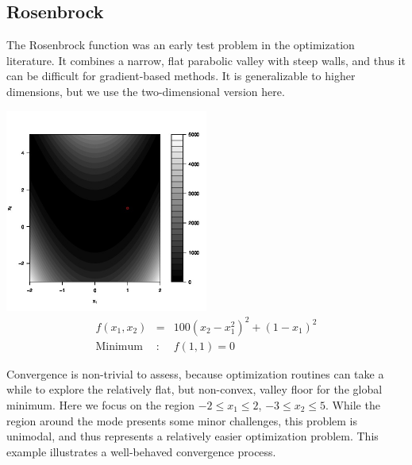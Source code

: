 \documentclass[12pt]{article}
\begin{document}
%
%
\subsection{Rosenbrock}
%
%

%
The Rosenbrock function \citep{rosePaper} was an early test problem in the optimization literature. 
%
It combines a narrow, flat parabolic valley with steep walls, and thus it can be difficult for gradient-based methods. It is generalizable to higher dimensions, but we use the two-dimensional version here.
%
\begin{center}
        \includegraphics[width=0.5\textwidth]{./figures/roseContourBW.jpg}
        \begin{eqnarray}
        f(x_1, x_2) &=& 100\left(x_2-x_1^2\right)^2 + (1-x_1)^2 \\
        \text{Minimum}&:& f(1, 1)=0\nonumber
        \label{roseEq}
        \end{eqnarray}  
\end{center}
%
Convergence is non-trivial to assess, because optimization routines can take a while to explore the relatively flat, but non-convex, valley floor for the global minimum.  
%
Here we focus on the region $-2\le x_1\le2$, $-3\le x_2\le5$.  
%
While the region around the mode presents some minor challenges, this problem is unimodal, and thus represents a relatively easier optimization problem.  
%
This example illustrates a well-behaved convergence process.
\end{document}
